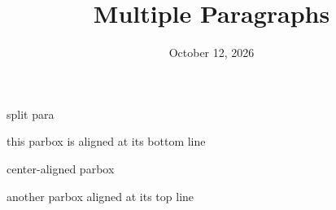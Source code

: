 \documentclass[12pt]{article}
\begin{document}
\title{Multiple Paragraphs}
\date{October 12, 2026}
\maketitle

split para
\quad\parbox[b]{4cm}{this parbox is aligned at its bottom line}
\quad\parbox{2cm}{center-aligned parbox}
\quad\parbox[t]{5cm}{another parbox aligned at its top line}
\end{document}
